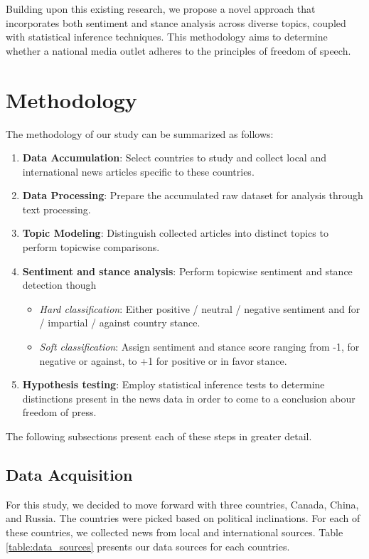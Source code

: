 \documentclass{article}
\theoremstyle{mytheoremstyle}
\theoremstyle{mytheoremstyle}
\theoremstyle{myproblemstyle}
\begin{document}
    Building upon this existing research, we propose a novel approach that incorporates both sentiment and stance analysis across diverse topics, coupled with statistical inference techniques. This methodology aims to determine whether a national media outlet adheres to the principles of freedom of speech.

    \section{Methodology}

    The methodology of our study can be summarized as follows:

    \begin{enumerate}
        \item \textbf{Data Accumulation}: Select countries to study and collect local and international news articles specific to these countries.
        \item \textbf{Data Processing}: Prepare the accumulated raw dataset for analysis through text processing.
        \item \textbf{Topic Modeling}: Distinguish collected articles into distinct topics to perform topicwise comparisons.
        \item \textbf{Sentiment and stance analysis}: Perform topicwise sentiment and stance detection though \begin{itemize}
            \item \emph{Hard classification}: Either positive / neutral / negative sentiment and for / impartial / against country stance.
            \item \emph{Soft classification}: Assign sentiment and stance score ranging from -1, for negative or against, to +1 for positive or in favor stance.
        \end{itemize}
        \item \textbf{Hypothesis testing}: Employ statistical inference tests to determine distinctions present in the news data in order to come to a conclusion abour freedom of press.
    \end{enumerate}

    The following subsections present each of these steps in greater detail.

    \subsection{Data Acquisition}

    For this study, we decided to move forward with three countries, Canada, China, and Russia. The countries were picked based on political inclinations. For each of these countries, we collected news from local and international sources. Table \ref{table:data_sources} presents our data sources for each countries.
\end{document}
